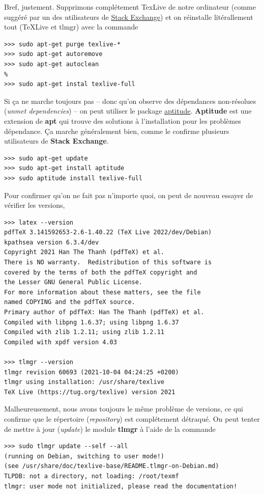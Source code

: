 \documentclass[8pt]{article}
\numberwithin{equation}{section}
\begin{document}
Bref, justement.
Supprimons complétement TexLive de notre ordinateur (comme suggéré par un des utilisateurs de \href{https://askubuntu.com/questions/989446/removing-texlive-from-ubuntu-16-04-lts-installed-using-terminal-apt-get}{Stack Exchange}) et on réinstalle litérallement tout (TeXLive et tlmgr) avec la commande 
\begin{verbatim}
>>> sudo apt-get purge texlive-*
>>> sudo apt-get autoremove
>>> sudo apt-get autoclean
%
>>> sudo apt-get instal texlive-full
\end{verbatim}
Si ça ne marche toujours pas -- donc qu'on observe des dépendances non-résolues (\emph{unmet dependencies}) -- on peut utiliser le package \href{https://www.baeldung.com/linux/unmet-dependencies-apt-get}{aptitude}.
\textbf{Aptitude} est une extension de \textbf{apt} qui trouve des solutions à l'installation pour les problèmes dépendance.
Ça marche généralement bien, comme le confirme plusieurs utilisateurs de \textbf{Stack Exchange}. 
\begin{verbatim}
>>> sudo apt-get update
>>> sudo apt-get install aptitude
>>> sudo aptitude install texlive-full
\end{verbatim}
Pour confirmer qu'on ne fait pas n'importe quoi, on peut de nouveau essayer de vérifier les versions,
\begin{verbatim}
>>> latex --version
pdfTeX 3.141592653-2.6-1.40.22 (TeX Live 2022/dev/Debian)
kpathsea version 6.3.4/dev
Copyright 2021 Han The Thanh (pdfTeX) et al.
There is NO warranty.  Redistribution of this software is
covered by the terms of both the pdfTeX copyright and
the Lesser GNU General Public License.
For more information about these matters, see the file
named COPYING and the pdfTeX source.
Primary author of pdfTeX: Han The Thanh (pdfTeX) et al.
Compiled with libpng 1.6.37; using libpng 1.6.37
Compiled with zlib 1.2.11; using zlib 1.2.11
Compiled with xpdf version 4.03

>>> tlmgr --version
tlmgr revision 60693 (2021-10-04 04:24:25 +0200)
tlmgr using installation: /usr/share/texlive
TeX Live (https://tug.org/texlive) version 2021
\end{verbatim}
Malheureusement, nous avons toujours le même problème de versions, ce qui confirme que le répertoire (\emph{repository}) est complétement détraqué.
On peut tenter de mettre à jour (\emph{update}) le module \textbf{tlmgr} à l'aide de la commande
\begin{verbatim}
>>> sudo tlmgr update --self --all
(running on Debian, switching to user mode!)
(see /usr/share/doc/texlive-base/README.tlmgr-on-Debian.md)
TLPDB: not a directory, not loading: /root/texmf
tlmgr: user mode not initialized, please read the documentation!
\end{verbatim}
\end{document}

